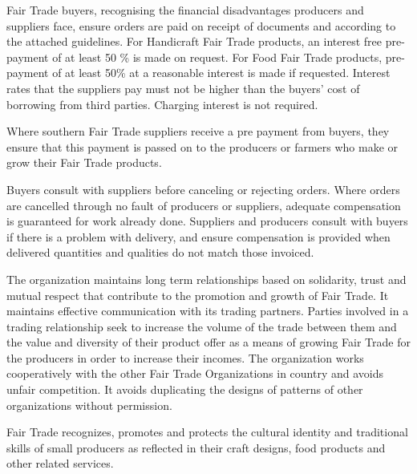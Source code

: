 \documentclass[]{book}
\begin{document}
Fair Trade buyers, recognising the financial disadvantages producers and suppliers face, ensure orders are paid on receipt of documents and according to the attached guidelines. For Handicraft Fair Trade products, an interest free pre-payment of at least 50 \% is made on request. For Food Fair Trade products, pre-payment of at least 50\% at a reasonable interest is made if requested. Interest rates that the suppliers pay must not be higher than the buyers' cost of borrowing from third parties. Charging interest is not required.

Where southern Fair Trade suppliers receive a pre payment from buyers, they ensure that this payment is passed on to the producers or farmers who make or grow their Fair Trade products.

Buyers consult with suppliers before canceling or rejecting orders. Where orders are cancelled through no fault of producers or suppliers, adequate compensation is guaranteed for work already done. Suppliers and producers consult with buyers if there is a problem with delivery, and ensure compensation is provided when delivered quantities and qualities do not match those invoiced.

The organization maintains long term relationships based on solidarity, trust and mutual respect that contribute to the promotion and growth of Fair Trade. It maintains effective communication with its trading partners. Parties involved in a trading relationship seek to increase the volume of the trade between them and the value and diversity of their product offer as a means of growing Fair Trade for the producers in order to increase their incomes. The organization works cooperatively with the other Fair Trade Organizations in country and avoids unfair competition. It avoids duplicating the designs of patterns of other organizations without permission.

Fair Trade recognizes, promotes and protects the cultural identity and traditional skills of small producers as reflected in their craft designs, food products and other related services.
\end{document}
